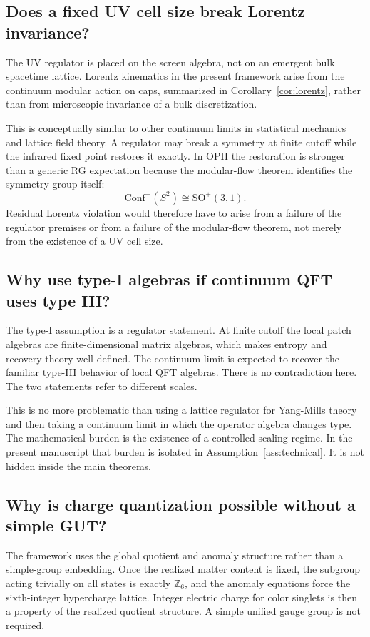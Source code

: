 \documentclass[11pt]{article}
\newcommand{\Conf}{\mathrm{Conf}}
\begin{document}
\subsection{Does a fixed UV cell size break Lorentz invariance?}

The UV regulator is placed on the screen algebra, not on an emergent bulk spacetime lattice. Lorentz kinematics in the present framework arise from the continuum modular action on caps, summarized in Corollary~\ref{cor:lorentz}, rather than from microscopic invariance of a bulk discretization.

This is conceptually similar to other continuum limits in statistical mechanics and lattice field theory. A regulator may break a symmetry at finite cutoff while the infrared fixed point restores it exactly. In OPH the restoration is stronger than a generic RG expectation because the modular-flow theorem identifies the symmetry group itself:
\[
\Conf^+(S^2)\cong \mathrm{SO}^+(3,1).
\]
Residual Lorentz violation would therefore have to arise from a failure of the regulator premises or from a failure of the modular-flow theorem, not merely from the existence of a UV cell size.

\subsection{Why use type-I algebras if continuum QFT uses type III?}

The type-I assumption is a regulator statement. At finite cutoff the local patch algebras are finite-dimensional matrix algebras, which makes entropy and recovery theory well defined. The continuum limit is expected to recover the familiar type-III behavior of local QFT algebras. There is no contradiction here. The two statements refer to different scales.

This is no more problematic than using a lattice regulator for Yang-Mills theory and then taking a continuum limit in which the operator algebra changes type. The mathematical burden is the existence of a controlled scaling regime. In the present manuscript that burden is isolated in Assumption~\ref{ass:technical}. It is not hidden inside the main theorems.

\subsection{Why is charge quantization possible without a simple GUT?}

The framework uses the global quotient and anomaly structure rather than a simple-group embedding. Once the realized matter content is fixed, the subgroup acting trivially on all states is exactly $\mathbb Z_6$, and the anomaly equations force the sixth-integer hypercharge lattice. Integer electric charge for color singlets is then a property of the realized quotient structure. A simple unified gauge group is not required.
\end{document}
